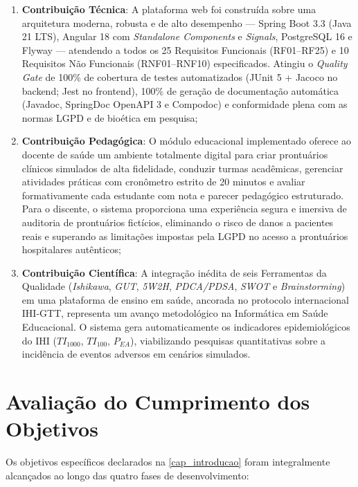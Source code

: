 \begin{enumerate}
    \item \textbf{Contribuição Técnica}: A plataforma web foi construída sobre
    uma arquitetura moderna, robusta e de alto desempenho — Spring Boot 3.3
    (Java 21 LTS), Angular 18 com \textit{Standalone Components} e \textit{Signals},
    PostgreSQL 16 e Flyway — atendendo a todos os 25 Requisitos Funcionais (RF01–RF25)
    e 10 Requisitos Não Funcionais (RNF01–RNF10) especificados. Atingiu o
    \textit{Quality Gate} de 100\% de cobertura de testes automatizados
    (JUnit 5 + Jacoco no backend; Jest no frontend), 100\% de geração de
    documentação automática (Javadoc, SpringDoc OpenAPI 3 e Compodoc) e
    conformidade plena com as normas LGPD e de bioética em pesquisa;

    \item \textbf{Contribuição Pedagógica}: O módulo educacional implementado
    oferece ao docente de saúde um ambiente totalmente digital para criar
    prontuários clínicos simulados de alta fidelidade, conduzir turmas
    acadêmicas, gerenciar atividades práticas com cronômetro estrito de 20
    minutos e avaliar formativamente cada estudante com nota e parecer
    pedagógico estruturado. Para o discente, o sistema proporciona uma
    experiência segura e imersiva de auditoria de prontuários fictícios,
    eliminando o risco de danos a pacientes reais e superando as limitações
    impostas pela LGPD no acesso a prontuários hospitalares autênticos;

    \item \textbf{Contribuição Científica}: A integração inédita de seis
    Ferramentas da Qualidade (\textit{Ishikawa}, \textit{GUT}, \textit{5W2H},
    \textit{PDCA/PDSA}, \textit{SWOT} e \textit{Brainstorming}) em uma
    plataforma de ensino em saúde, ancorada no protocolo internacional
    IHI-GTT, representa um avanço metodológico na Informática em Saúde
    Educacional. O sistema gera automaticamente os indicadores epidemiológicos
    do IHI ($TI_{1000}$, $TI_{100}$, $P_{EA}$), viabilizando pesquisas
    quantitativas sobre a incidência de eventos adversos em cenários simulados.
\end{enumerate}

\section{Avaliação do Cumprimento dos Objetivos}
\label{sec_avaliacao_objetivos}

Os objetivos específicos declarados na \autoref{cap_introducao} foram integralmente
alcançados ao longo das quatro fases de desenvolvimento:

